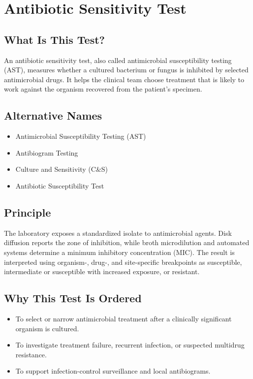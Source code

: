 \chapter{Antibiotic Sensitivity Test}

\section*{What Is This Test?}
An antibiotic sensitivity test, also called antimicrobial susceptibility testing (AST), measures whether a cultured bacterium or fungus is inhibited by selected antimicrobial drugs. It helps the clinical team choose treatment that is likely to work against the organism recovered from the patient's specimen.

\section*{Alternative Names}
\begin{itemize}
  \item Antimicrobial Susceptibility Testing (AST)
  \item Antibiogram Testing
  \item Culture and Sensitivity (C\&S)
  \item Antibiotic Susceptibility Test
\end{itemize}

\section*{Principle}
The laboratory exposes a standardized isolate to antimicrobial agents. Disk diffusion reports the zone of inhibition, while broth microdilution and automated systems determine a minimum inhibitory concentration (MIC). The result is interpreted using organism-, drug-, and site-specific breakpoints as susceptible, intermediate or susceptible with increased exposure, or resistant.

\section*{Why This Test Is Ordered}
\begin{itemize}
  \item To select or narrow antimicrobial treatment after a clinically significant organism is cultured.
  \item To investigate treatment failure, recurrent infection, or suspected multidrug resistance.
  \item To support infection-control surveillance and local antibiograms.
\end{itemize}

